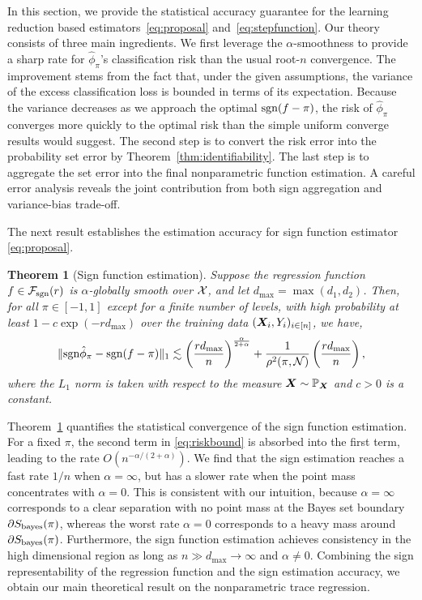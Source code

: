 \documentclass[aos]{imsart}
\newtheorem{theorem}{Theorem}%
\theoremstyle{definition}
\def\sign{\textup{sgn}}
\def\bayesS{S_{\textup{bayes}}}
\def\caliF{\tF_{\textup{sgn}}}
\begin{document}
In this section, we provide the statistical accuracy guarantee for the learning reduction based estimators~\eqref{eq:proposal} and~\eqref{eq:stepfunction}. Our theory consists of three main ingredients. We first leverage the $\alpha$-smoothness to provide a sharp rate for $\hat \phi_\pi$'s classification risk than the usual root-$n$ convergence. The improvement stems from the fact that, under the given assumptions, the variance of the excess classification loss is bounded in terms of its expectation. Because the variance decreases as we approach the optimal $\sign(f-\pi)$, the risk of $\hat \phi_\pi$ converges more quickly to the optimal risk than the simple uniform converge results would suggest.  The second step is to convert the risk error into the probability set error by Theorem~\ref{thm:identifiability}. The last step is to aggregate the set error into the final nonparametric function estimation. A careful error analysis reveals the joint contribution from both sign aggregation and variance-bias trade-off. 

The next result establishes the estimation accuracy for sign function estimator \eqref{eq:proposal}. 

\begin{theorem}[Sign function estimation]\label{thm:main} Suppose the regression function $f\in\caliF(r)$ is $\alpha$-globally smooth over $\mathcal{X}$, and let $d_{\max}=\max(d_1,d_2)$. Then, for all $\pi\in[-1,1]$ except for a finite number of levels, with high probability at least $1-c\exp(-rd_{\max})$ over the training data $(\bm X_i,Y_i)_{i\in[n]}$, we have, 
\begin{equation}\label{eq:riskbound}
\onenormSize{}{\sign \hat \phi_\pi- \sign(f-\pi)} \lesssim \left({rd_{\max} \over n}\right)^{\alpha\over 2+\alpha}+{1\over \rho^2(\pi, \tN)}\left({rd_{\max}\over n}\right),
\end{equation}
where the $L_1$ norm is taken with respect to the measure $\bm X\sim\mathbb{P}_{\bm X}$ and $c>0$ is a constant. 
\end{theorem}

\noindent
Theorem~\ref{thm:main} quantifies the statistical convergence of the sign function estimation. For a fixed $\pi$, the second term in \eqref{eq:riskbound} is absorbed into the first term, leading to the rate $O(n^{-\alpha/(2+\alpha)})$. We find that the sign estimation reaches a fast rate $1/n$ when $\alpha =\infty$, but has a slower rate when the point mass concentrates with $\alpha=0$. This is consistent with our intuition, because $\alpha = \infty$ corresponds to a clear separation with no point mass at the Bayes set boundary $\partial \bayesS(\pi)$, whereas the worst rate $\alpha = 0$ corresponds to a heavy mass around $\partial \bayesS(\pi)$. Furthermore, the sign function estimation achieves consistency in the high dimensional region as long as $n \gg d_{\max}\to \infty$ and $\alpha\neq 0$. Combining the sign representability of the regression function and the sign estimation accuracy, we obtain our main theoretical result on the nonparametric trace regression. 
\end{document}
